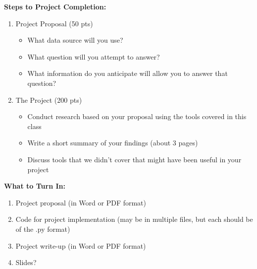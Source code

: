 \documentclass[12pt, margin=.5in]{article}
\begin{document}
\begin{large}
\textbf{Steps to Project Completion:}
\begin{enumerate}
\item Project Proposal (50 pts)
\begin{itemize}
\item What data source will you use?
\item What question will you attempt to answer?
\item What information do you anticipate will allow you to answer that question?
\end{itemize}
\item The Project (200 pts)
\begin{itemize}
\item Conduct research based on your proposal using the tools covered in this class
\item Write a short summary of your findings (about 3 pages)
\item Discuss tools that we didn't cover that might have been useful in your project
\end{itemize}
\end{enumerate}

\textbf{What to Turn In:}
\begin{enumerate}
\item Project proposal (in Word or PDF format)
\item Code for project implementation (may be in multiple files, but each should be of the .py format)
\item Project write-up (in Word or PDF format)
\item Slides?
\end{enumerate}

\end{large}
\end{document}
